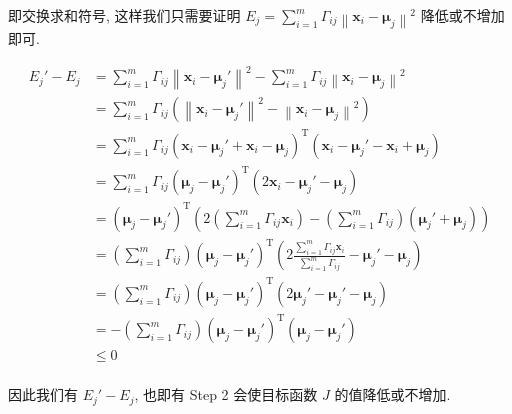 \documentclass[answers]{exam}  %
\begin{document}
\begin{questions}
\begin{solution}
\begin{enumerate}
            即交换求和符号, 这样我们只需要证明 $\displaystyle E_{j} = \sum_{i=1}^{m}\Gamma_{ij}\left\| \bm{x}_i - \bm{\mu}_j \right\|^{2}$ 降低或不增加即可.

            $$
              \begin{aligned}
                E_j' - E_j & = \sum_{i=1}^{m}\Gamma_{ij}\left\| \bm{x}_i - \bm{\mu}_j' \right\|^{2} - \sum_{i=1}^{m}\Gamma_{ij}\left\| \bm{x}_i - \bm{\mu}_j \right\|^{2}                          \\
                           & = \sum_{i=1}^{m}\Gamma_{ij}(\left\| \bm{x}_i - \bm{\mu}_j' \right\|^{2} - \left\| \bm{x}_i - \bm{\mu}_j \right\|^{2})                                                 \\
                           & = \sum_{i=1}^{m}\Gamma_{ij}(\bm{x}_i - \bm{\mu}_j' + \bm{x}_i - \bm{\mu}_j)^{\mathrm{T}}(\bm{x}_i - \bm{\mu}_j' - \bm{x}_i + \bm{\mu}_j)                              \\
                           & = \sum_{i=1}^{m}\Gamma_{ij}(\bm{\mu}_j - \bm{\mu}_j')^{\mathrm{T}}(2\bm{x}_i - \bm{\mu}_j' - \bm{\mu}_j)                                                              \\
                           & = (\bm{\mu}_j - \bm{\mu}_j')^{\mathrm{T}}(2(\sum_{i=1}^{m}\Gamma_{ij}\bm{x}_i) - (\sum_{i=1}^{m}\Gamma_{ij})(\bm{\mu}_j' + \bm{\mu}_j))                               \\
                           & = (\sum_{i=1}^{m}\Gamma_{ij})(\bm{\mu}_j - \bm{\mu}_j')^{\mathrm{T}}(2\frac{\sum_{i=1}^{m}\Gamma_{ij}\bm{x}_i}{\sum_{i=1}^{m}\Gamma_{ij}} - \bm{\mu}_j' - \bm{\mu}_j) \\
                           & = (\sum_{i=1}^{m}\Gamma_{ij})(\bm{\mu}_j - \bm{\mu}_j')^{\mathrm{T}}(2\bm{\mu}_j' - \bm{\mu}_j' - \bm{\mu}_j)                                                         \\
                           & = -(\sum_{i=1}^{m}\Gamma_{ij})(\bm{\mu}_j - \bm{\mu}_j')^{\mathrm{T}}(\bm{\mu}_j - \bm{\mu}_j')                                                                       \\
                           & \le 0                                                                                                                                                                 \\
              \end{aligned}
            $$

            因此我们有 $E_j' - E_j$, 也即有 Step 2 会使目标函数 $J$ 的值降低或不增加.


\end{enumerate}
\end{solution}
\end{questions}
\end{document}

